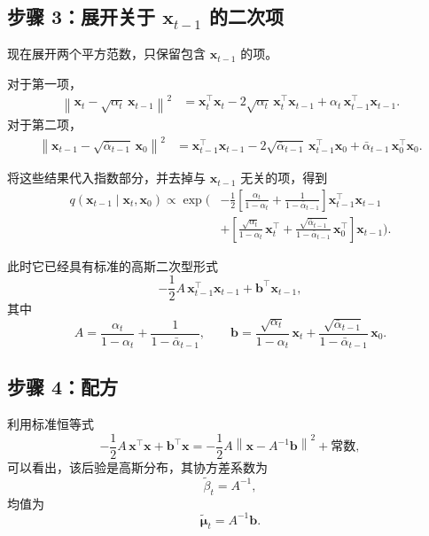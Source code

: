 \subsection*{步骤 3：展开关于 \texorpdfstring{$\mathbf{x}_{t-1}$}{x\_\{t-1\}} 的二次项}

现在展开两个平方范数，只保留包含 \(\mathbf{x}_{t-1}\) 的项。

对于第一项，
\[
\begin{aligned}
\left\|
\mathbf{x}_t-\sqrt{\alpha_t}\,\mathbf{x}_{t-1}
\right\|^2
&=
\mathbf{x}_t^\top\mathbf{x}_t
-2\sqrt{\alpha_t}\,\mathbf{x}_t^\top \mathbf{x}_{t-1}
+\alpha_t\,\mathbf{x}_{t-1}^\top \mathbf{x}_{t-1}.
\end{aligned}
\]
对于第二项，
\[
\begin{aligned}
\left\|
\mathbf{x}_{t-1}-\sqrt{\bar{\alpha}_{t-1}}\,\mathbf{x}_0
\right\|^2
&=
\mathbf{x}_{t-1}^\top \mathbf{x}_{t-1}
-2\sqrt{\bar{\alpha}_{t-1}}\,\mathbf{x}_{t-1}^\top \mathbf{x}_0
+\bar{\alpha}_{t-1}\,\mathbf{x}_0^\top\mathbf{x}_0.
\end{aligned}
\]

将这些结果代入指数部分，并去掉与 \(\mathbf{x}_{t-1}\) 无关的项，得到
\[
\begin{aligned}
q(\mathbf{x}_{t-1}\mid \mathbf{x}_t,\mathbf{x}_0)
\propto
\exp\!\Bigg(
&-\frac{1}{2}
\left[
\frac{\alpha_t}{1-\alpha_t}
+
\frac{1}{1-\bar{\alpha}_{t-1}}
\right]
\mathbf{x}_{t-1}^\top \mathbf{x}_{t-1}
\\
&+
\left[
\frac{\sqrt{\alpha_t}}{1-\alpha_t}\,\mathbf{x}_t^\top
+
\frac{\sqrt{\bar{\alpha}_{t-1}}}{1-\bar{\alpha}_{t-1}}\,\mathbf{x}_0^\top
\right]
\mathbf{x}_{t-1}
\Bigg).
\end{aligned}
\]

此时它已经具有标准的高斯二次型形式
\[
-\frac12 A\,\mathbf{x}_{t-1}^\top \mathbf{x}_{t-1}
+
\mathbf{b}^\top \mathbf{x}_{t-1},
\]
其中
\[
A
=
\frac{\alpha_t}{1-\alpha_t}
+
\frac{1}{1-\bar{\alpha}_{t-1}},
\qquad
\mathbf{b}
=
\frac{\sqrt{\alpha_t}}{1-\alpha_t}\,\mathbf{x}_t
+
\frac{\sqrt{\bar{\alpha}_{t-1}}}{1-\bar{\alpha}_{t-1}}\,\mathbf{x}_0.
\]

\subsection*{步骤 4：配方}

利用标准恒等式
\[
-\frac12 A\,\mathbf{x}^\top\mathbf{x}
+
\mathbf{b}^\top\mathbf{x}
=
-\frac12 A
\left\|
\mathbf{x}-A^{-1}\mathbf{b}
\right\|^2
+\text{常数},
\]
可以看出，该后验是高斯分布，其协方差系数为
\[
\tilde{\beta}_t = A^{-1},
\]
均值为
\[
\tilde{\boldsymbol{\mu}}_t = A^{-1}\mathbf{b}.
\]

